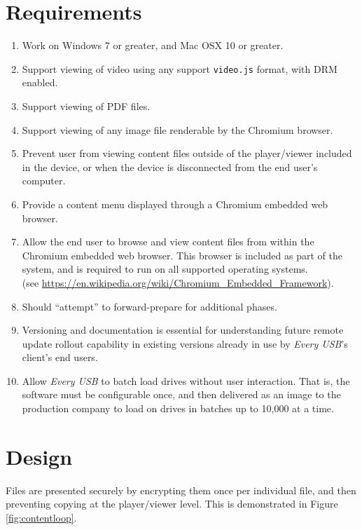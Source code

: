 \documentclass{article}
\begin{document}
\section{Requirements}

\begin{enumerate}
\item Work on Windows 7 or greater, and Mac OSX 10 or greater.
\item Support viewing of video using any support \verb+video.js+ format, 
with DRM enabled.
\item Support viewing of PDF files.
\item Support viewing of any image file renderable by the Chromium browser.
\item Prevent user from viewing content files outside of the 
player/viewer included in the device, or when the device is disconnected from 
the end user's computer.
\item Provide a content menu displayed through a Chromium embedded web browser.
\item Allow the end user to browse and view content files from within the
Chromium embedded web browser.  This browser is included as part of
the system, and is required to run on all supported operating
systems.\\
(see \url{https://en.wikipedia.org/wiki/Chromium_Embedded_Framework}).  
\item Should “attempt” to forward-prepare for additional phases.
\item Versioning and documentation is essential for understanding
future remote update rollout capability in existing versions already
in use by {\it Every USB}’s client’s end users.
\item Allow {\it Every USB} to batch load drives without user interaction.  That is,
the software must be configurable once, and then delivered as an image
to the production company to load on drives in batches up to 10,000 at
a time.

\end{enumerate}

\newpage
\section{Design}

Files are presented securely by encrypting them once per individual file,
and then preventing copying at the player/viewer level.  This is demonstrated
in Figure \ref{fig:contentloop}.
\end{document}

